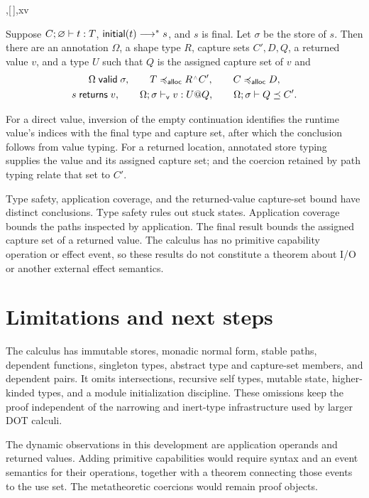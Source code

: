 \documentclass[acmsmall,screen,nonacm]{acmart}
\begin{document}
  {\langle\sigma,[\,],x\rangle\returns v}
\endgroup

\begin{theorem}
\label{thm:returned-capture-bound}
Suppose \({C}; {\varnothing}\vdash {t} : {T}\),
\(\mathsf{initial}(t)\longrightarrow^{*} s\), and \(s\) is final. Let \(\sigma\) be the
store of \(s\). Then there are an annotation \(\Omega\), a shape type \(R\),
capture sets \(C',D,Q\), a returned value \(v\), and a type \(U\) such that \(Q\) is the assigned
capture set of \(v\) and
\[
 \begin{gathered}
 \Omega\valid\sigma,
 \qquad T\extends R\capt C',
 \qquad C\extends D,
 \\
 s\returns v,
 \qquad
 \Omega;\sigma\vdash_{\mathsf v}v:U@Q,
 \qquad
 \Omega;\sigma\vdash Q\semleq C'.
 \end{gathered}
\]
\end{theorem}

For a direct value, inversion of the empty continuation identifies the
runtime value's indices with the final type and capture set, after which the
conclusion follows from value typing. For a returned location, annotated
store typing supplies the value and its assigned capture set;
 and the coercion retained by path typing relate that set
to \(C'\).

Type safety, application coverage, and the returned-value capture-set bound have
distinct conclusions. Type safety rules out stuck states. Application
coverage bounds the paths inspected by application. The final result bounds
the assigned capture set of a returned value. The calculus has no primitive capability
operation or effect event, so these results do not constitute a theorem about
I/O or another external effect semantics.

\section{Limitations and next steps}

The calculus has immutable stores, monadic normal form, stable paths,
dependent functions, singleton types, abstract type and capture-set members, and
dependent pairs.  It omits intersections, recursive self types, mutable
state, higher-kinded types, and a module initialization discipline.  These
omissions keep the proof independent of the narrowing and inert-type
infrastructure used by larger DOT calculi.

The dynamic observations in this development are application operands and
returned values.  Adding primitive capabilities would require syntax and an
event semantics for their operations, together with a theorem connecting
those events to the use set. The metatheoretic coercions would remain proof
objects.
\end{document}
